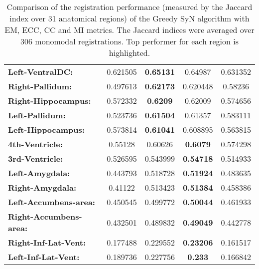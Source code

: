 \begin{table}[htbp]
{\begin{tabular}{lcccc}
    \textbf{Left-VentralDC:} & 0.621505 & \textbf{0.65131} & 0.64987 & 0.631352 \\
    \textbf{Right-Pallidum:} & 0.497613 & \textbf{0.62173} & 0.620448 & 0.58236 \\
    \textbf{Right-Hippocampus:} & 0.572332 & \textbf{0.6209} & 0.62009 & 0.574656 \\
    \textbf{Left-Pallidum:} & 0.523736 & \textbf{0.61504} & 0.61357 & 0.583111 \\
    \textbf{Left-Hippocampus:} & 0.573814 & \textbf{0.61041} & 0.608895 & 0.563815 \\
    \textbf{4th-Ventricle:} & 0.55128 & 0.60626 & \textbf{0.6079} & 0.574298 \\
    \textbf{3rd-Ventricle:} & 0.526595 & 0.543999 & \textbf{0.54718} & 0.514933 \\
    \textbf{Left-Amygdala:} & 0.443793 & 0.518728 & \textbf{0.51924} & 0.483635 \\
    \textbf{Right-Amygdala:} & 0.41122 & 0.513423 & \textbf{0.51384} & 0.458386 \\
    \textbf{Left-Accumbens-area:} & 0.450545 & 0.499772 & \textbf{0.50044} & 0.461933 \\
    \textbf{Right-Accumbens-area:} & 0.432501 & 0.489832 & \textbf{0.49049} & 0.442778 \\
    \textbf{Right-Inf-Lat-Vent:} & 0.177488 & 0.229552 & \textbf{0.23206} & 0.161517 \\
    \textbf{Left-Inf-Lat-Vent:} & 0.189736 & 0.227756 & \textbf{0.233} & 0.166842 \\
    \bottomrule
    \end{tabular}}%
    \caption{Comparison of the registration performance (measured by the Jaccard index over 31 anatomical regions) of the Greedy SyN algorithm with EM, ECC, CC and MI metrics.
The Jaccard indices were averaged over 306 monomodal registrations. Top performer for each region is highlighted.}
  \label{tab:monomodal_results_seg}%
\end{table}%
